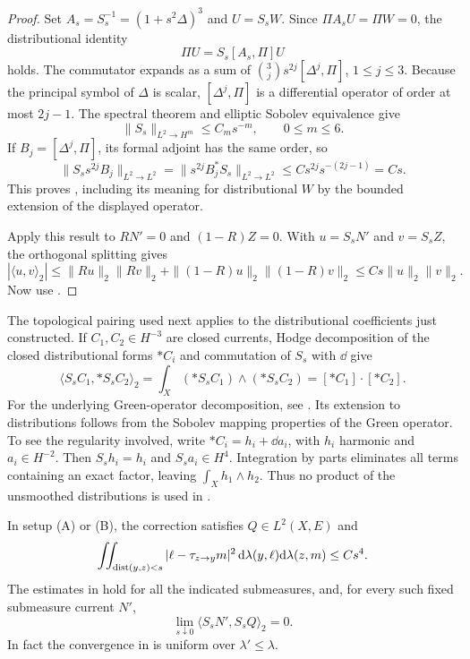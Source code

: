 \begin{proof}
Set $A_s=S_s^{-1}=(1+s^2\Delta)^3$ and $U=S_sW$.  Since
$\Pi A_sU=\Pi W=0$, the distributional identity
\[
 \Pi U=S_s[A_s,\Pi]U
\]
holds.  The commutator expands as a sum of
$\binom3j s^{2j}[\Delta^j,\Pi]$, $1\le j\le3$.
Because the principal symbol of $\Delta$ is scalar,
$[\Delta^j,\Pi]$ is a differential operator of order at most $2j-1$.
The spectral theorem and elliptic Sobolev equivalence give
\[
 \|S_s\|_{L^2\to H^m}\le C_ms^{-m},\qquad 0\le m\le6.
\]
If $B_j=[\Delta^j,\Pi]$, its formal adjoint has the same order, so
\[
 \|S_s s^{2j}B_j\|_{L^2\to L^2}
 =\|s^{2j}B_j^*S_s\|_{L^2\to L^2}
 \le Cs^{2j}s^{-(2j-1)}=Cs.
\]
This proves , including its meaning
for distributional $W$ by the bounded extension of the displayed
operator.

Apply this result to $R N'=0$ and $(1-R)Z=0$.  With $u=S_sN'$ and
$v=S_sZ$, the orthogonal splitting gives
\[
 |\langle u,v\rangle_2|
 \le\|Ru\|_2\|Rv\|_2+
       \|(1-R)u\|_2\|(1-R)v\|_2
 \le Cs\|u\|_2\|v\|_2.
\]
Now use .
\end{proof}

The topological pairing used next applies to the distributional
coefficients just constructed.  If $C_1,C_2\in H^{-3}$ are closed
currents, Hodge decomposition of the closed distributional forms $*C_i$
and commutation of $S_s$ with $\dd$ give
\begin{equation}\label{eq:current-topological-pairing}
 \langle S_sC_1,*S_sC_2\rangle_2
  =\int_X(*S_sC_1)\wedge(*S_sC_2)
  =[*C_1]\cdot[*C_2].
\end{equation}
For the underlying Green-operator decomposition, see
\cite[Sections~1--2, equations~(1.20)--(1.22) and~(2.1)--(2.2)]{TaylorHodge2010}.
Its extension to distributions follows from the Sobolev mapping
properties of the Green operator. To see the regularity involved,
write $*C_i=h_i+\dd a_i$, with $h_i$
harmonic and $a_i\in H^{-2}$.  Then $S_sh_i=h_i$ and
$S_sa_i\in H^4$.  Integration by parts eliminates all terms containing
an exact factor, leaving $\int_Xh_1\wedge h_2$.  Thus no product of the
unsmoothed distributions is used in
.

\begin{proposition}\label{prop:angular-energy}
In setup \textup{(A)} or \textup{(B)}, the correction satisfies
$Q\in L^2(X,E)$ and
\begin{equation}\label{eq:current-angular-energy}
 \iint_{\operatorname{dist}(y,z)<s}|\ell-\tau_{z\to y}m|^2
           \,\mathrm d\lambda(y,\ell)\mathrm d\lambda(z,m)\le Cs^4.
\end{equation}
The estimates in
 hold for all
the indicated submeasures, and, for every such fixed submeasure current
$N'$,
\begin{equation}\label{eq:current-mixed-vanishing}
 \lim_{s\downarrow0}\langle S_sN',S_sQ\rangle_2=0.
\end{equation}
In fact the convergence in  is uniform
over $\lambda'\le\lambda$.
\end{proposition}

